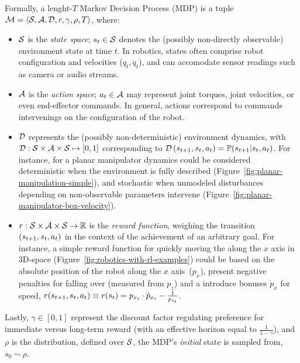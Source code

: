 Formally, a lenght-\(T\) Markov Decision Process (MDP) is a tuple \( \mathcal M = \langle \mathcal S, \mathcal A, \mathcal D, r, \gamma, \rho, T \rangle \), where:
\begin{itemize}
    \item \(\mathcal S\) is the \emph{state space}; \(s_t \in \mathcal S\) denotes the (possibly non-directly observable) environment state at time \(t\). In robotics, states often comprise robot configuration and velocities (\(q_t, \dot q_t\)), and can accomodate sensor readings such as camera or audio streams.
    \item \(\mathcal A\) is the \emph{action space}; \(a_t \in \mathcal A\) may represent joint torques, joint velocities, or even end-effector commands. In general, actions correspond to commands intervenings on the configuration of the robot. 
    \item \(\mathcal D\) represents the (possibly non-deterministic) environment dynamics, with \(\mathcal D: \mathcal S \times \mathcal A \times \mathcal S \mapsto [0, 1] \) corresponding to \( \mathcal D \, (s_{t+1}, s_t, a_t) = \mathbb P (s_{t+1} \vert s_t, a_t) \). For instance, for a planar manipulator dynamics could be considered deterministic when the environment is fully described (Figure~\ref{fig:planar-manipulation-simple}), and stochastic when unmodeled disturbances depending on non-observable parameters intervene (Figure~\ref{fig:planar-manipulator-box-velocity}).
    \item \(r: \mathcal S \times \mathcal A \times \mathcal S \to \mathbb R\) is the \emph{reward function}, weighing the transition \( (s_{t+1}, s_t, a_t) \) in the context of the achievement of an arbitrary goal. For instance, a simple reward function for quickly moving the along the \( x \) axis in 3D-space (Figure~\ref{fig:robotics-with-rl-examples}) could be based on the absolute position of the robot along the \( x \) axis~(\(p_x\)), present negative penalties for falling over (measured from \( p_z \)) and a introduce bonuses \( \dot p_x \) for speed, \(r (s_{t+1}, s_t, a_t) \equiv r(s_t) = p_{x_t} \cdot \dot p_{x_t} - \tfrac{1}{p_{z_t}} \).
\end{itemize}
Lastly, \(\gamma \in [0,1] \) represent the discount factor regulating preference for immediate versus long-term reward (with an effective horizon equal to \( \tfrac{1}{1-\gamma} \)), and \( \rho \) is the distribution, defined over \(\mathcal S \), the MDP's \emph{initial} state is sampled from, \( s_0 \sim \rho \).

